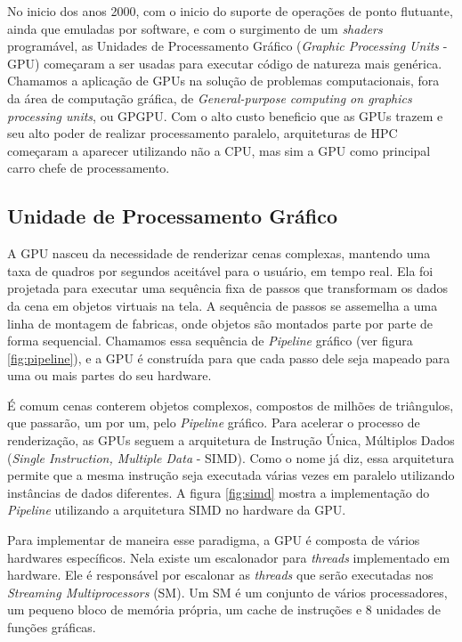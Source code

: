    No inicio dos anos 2000, com o inicio do suporte de operações de ponto flutuante, ainda que emuladas por software, 
e com o surgimento de um \textit{shaders} programável, as Unidades de Processamento Gráfico 
(\textit{Graphic Processing Units} - GPU) começaram a ser usadas para executar código de natureza mais genérica.
Chamamos a aplicação de GPUs na solução de problemas computacionais, fora da área de computação gráfica, 
de \textit{General-purpose computing on graphics processing units}, ou GPGPU. Com o alto custo beneficio que as GPUs 
trazem e seu alto poder de realizar processamento paralelo, arquiteturas de HPC começaram a aparecer utilizando não a 
CPU, mas sim a GPU como principal carro chefe de processamento.

\subsection{Unidade de Processamento Gráfico}
    A GPU nasceu da necessidade de renderizar cenas complexas, mantendo uma taxa de quadros por segundos
aceitável para o usuário, em tempo real. Ela foi projetada para executar uma sequência fixa de passos que transformam
os dados da cena em objetos virtuais na tela. A sequência de passos se assemelha a uma linha de montagem de fabricas,
onde objetos são montados parte por parte de forma sequencial. Chamamos essa sequência de \textit{Pipeline} gráfico 
(ver figura \ref{fig:pipeline}), e a GPU é construída para que cada passo dele seja mapeado para uma ou mais partes do 
seu hardware.

    É comum cenas conterem objetos complexos, compostos de milhões de triângulos, que passarão, um por um, pelo
\textit{Pipeline} gráfico. Para acelerar o processo de renderização, as GPUs seguem a arquitetura de Instrução Única,
Múltiplos Dados (\textit{Single Instruction, Multiple Data} - SIMD). Como o nome já diz, essa arquitetura permite que 
a mesma instrução seja executada várias vezes em paralelo utilizando instâncias de dados diferentes. A figura 
\ref{fig:simd} mostra a implementação do \textit{Pipeline} utilizando a arquitetura SIMD no hardware da GPU.
    
    Para implementar de maneira esse paradigma, a GPU é composta de vários hardwares específicos. Nela existe um 
escalonador para \textit{threads} implementado em hardware. Ele é responsável por escalonar as \textit{threads} que serão
executadas nos \textit{Streaming Multiprocessors} (SM). Um SM é um conjunto de vários processadores, um pequeno bloco de
memória própria, um cache de instruções e 8 unidades de funções gráficas.

